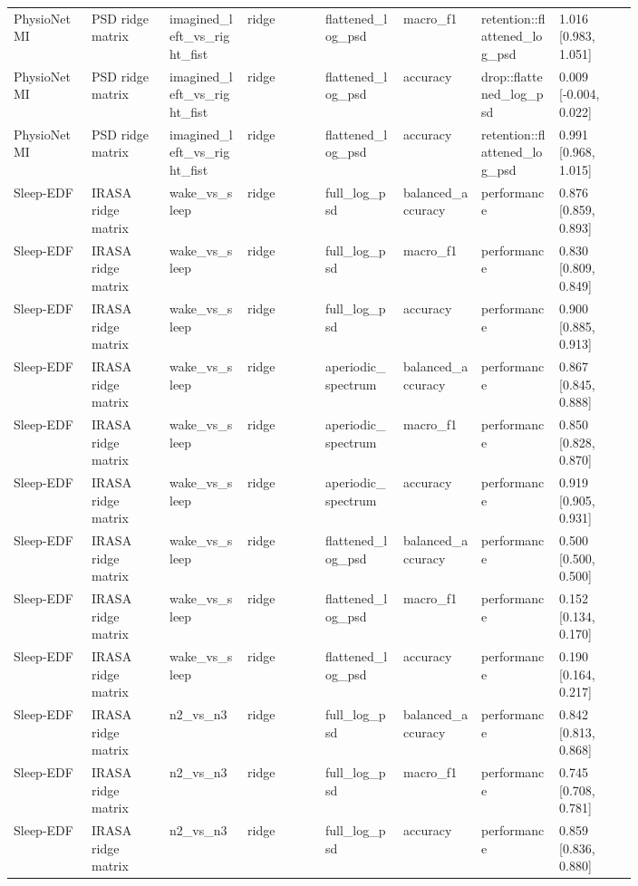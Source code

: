 \begin{longtable}{p{0.10\linewidth}p{0.10\linewidth}p{0.10\linewidth}p{0.10\linewidth}p{0.10\linewidth}p{0.10\linewidth}p{0.10\linewidth}p{0.10\linewidth}}
PhysioNet MI & PSD ridge matrix & imagined\_left\_vs\_right\_fist & ridge & flattened\_log\_psd & macro\_f1 & retention::flattened\_log\_psd & 1.016 [0.983, 1.051]\\
PhysioNet MI & PSD ridge matrix & imagined\_left\_vs\_right\_fist & ridge & flattened\_log\_psd & accuracy & drop::flattened\_log\_psd & 0.009 [-0.004, 0.022]\\
PhysioNet MI & PSD ridge matrix & imagined\_left\_vs\_right\_fist & ridge & flattened\_log\_psd & accuracy & retention::flattened\_log\_psd & 0.991 [0.968, 1.015]\\
Sleep-EDF & IRASA ridge matrix & wake\_vs\_sleep & ridge & full\_log\_psd & balanced\_accuracy & performance & 0.876 [0.859, 0.893]\\
Sleep-EDF & IRASA ridge matrix & wake\_vs\_sleep & ridge & full\_log\_psd & macro\_f1 & performance & 0.830 [0.809, 0.849]\\
Sleep-EDF & IRASA ridge matrix & wake\_vs\_sleep & ridge & full\_log\_psd & accuracy & performance & 0.900 [0.885, 0.913]\\
Sleep-EDF & IRASA ridge matrix & wake\_vs\_sleep & ridge & aperiodic\_spectrum & balanced\_accuracy & performance & 0.867 [0.845, 0.888]\\
Sleep-EDF & IRASA ridge matrix & wake\_vs\_sleep & ridge & aperiodic\_spectrum & macro\_f1 & performance & 0.850 [0.828, 0.870]\\
Sleep-EDF & IRASA ridge matrix & wake\_vs\_sleep & ridge & aperiodic\_spectrum & accuracy & performance & 0.919 [0.905, 0.931]\\
Sleep-EDF & IRASA ridge matrix & wake\_vs\_sleep & ridge & flattened\_log\_psd & balanced\_accuracy & performance & 0.500 [0.500, 0.500]\\
Sleep-EDF & IRASA ridge matrix & wake\_vs\_sleep & ridge & flattened\_log\_psd & macro\_f1 & performance & 0.152 [0.134, 0.170]\\
Sleep-EDF & IRASA ridge matrix & wake\_vs\_sleep & ridge & flattened\_log\_psd & accuracy & performance & 0.190 [0.164, 0.217]\\
Sleep-EDF & IRASA ridge matrix & n2\_vs\_n3 & ridge & full\_log\_psd & balanced\_accuracy & performance & 0.842 [0.813, 0.868]\\
Sleep-EDF & IRASA ridge matrix & n2\_vs\_n3 & ridge & full\_log\_psd & macro\_f1 & performance & 0.745 [0.708, 0.781]\\
Sleep-EDF & IRASA ridge matrix & n2\_vs\_n3 & ridge & full\_log\_psd & accuracy & performance & 0.859 [0.836, 0.880]\\

\end{longtable}
